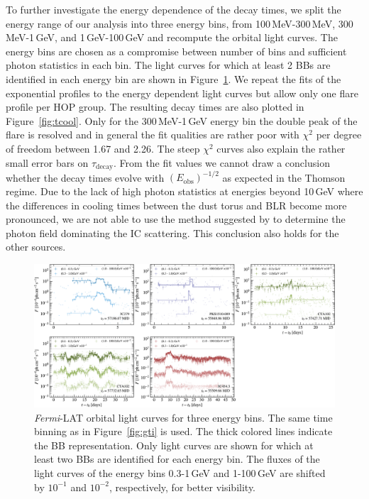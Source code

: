 \documentclass[twocolumn,linenumbers]{aastex62}
\newcommand{\fermiLAT}{\emph{Fermi}-LAT\xspace}
\begin{document}
To further investigate the energy dependence of the decay times, we split the energy range of our analysis into three energy bins, 
 from 100\,MeV-300\,MeV, 300\,MeV-1\,GeV, and 1\,GeV-100\,GeV and recompute the orbital light curves.
The energy bins are chosen as a compromise between number of bins and sufficient photon statistics in each bin. 
The light curves for which at least 2 BBs are identified in each energy bin are shown in Figure~\ref{fig:lcebins}.
We repeat the fits of the exponential profiles to the energy dependent light curves but allow only one flare profile per HOP group. 
The resulting decay times are also plotted in Figure~\ref{fig:tcool}. %
Only for the 300\,MeV-1\,GeV energy bin the double peak of the flare is resolved and in general the fit qualities are rather poor with $\chi^2$ per degree of freedom between 1.67 and 2.26.
The steep $\chi^2$ curves also explain the rather small error bars on $\tau_\mathrm{decay}$. 
From the fit values we cannot draw a conclusion whether the decay times evolve with $(E_\mathrm{obs})^{-1/2}$ as expected in the Thomson regime.
Due to the lack of high photon statistics at energies beyond 10\,GeV where the differences in cooling times between the dust torus and BLR become more pronounced, we are not able to use the method suggested by \citet{2012ApJ...758L..15D} to determine the photon field dominating the IC scattering. 
This conclusion also holds for the other sources. 

\begin{figure}
    \centering
    \includegraphics[width = .9 \linewidth]{lc_ebins_ts9.pdf}
    \caption{\fermiLAT orbital light curves for three energy bins. The same time binning as in Figure~\ref{fig:gti} is used. The thick colored lines indicate the BB representation. Only light curves are shown for which at least two BBs are identified for each energy bin. The fluxes of the light curves of the energy bins 0.3-1\,GeV and 1-100\,GeV are shifted by $10^{-1}$ and $10^{-2}$, respectively, for better visibility. }
    \label{fig:lcebins}
\end{figure}
\end{document}
